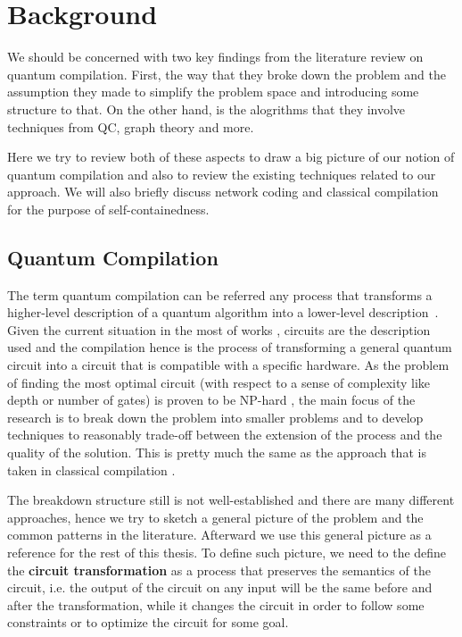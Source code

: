 \documentclass{report}
\begin{document}
\chapter{Background}\label{chap:background}

We should be concerned with two key findings from the literature review on quantum compilation. First, the way that they broke down the problem and the assumption they made to simplify the problem space and introducing some structure to that. On the other hand, is the alogrithms that they involve techniques from QC, graph theory and more.

Here we try to review both of these aspects to draw a big picture of our notion of quantum compilation and also to review the existing techniques related to our approach. We will also briefly discuss network coding and classical compilation for the purpose of self-containedness.

\section{Quantum Compilation}


The term quantum compilation can be referred any process that transforms a higher-level description of a quantum algorithm into a lower-level description~\cite{hundt2022}. Given the current situation in the most of works \cite{zulehner2018,childs,cross2022,sivarajah2021,qiskit2023,paler2021}, circuits are the description used and the compilation hence is the process of transforming a general quantum circuit into a circuit that is compatible with a specific hardware. As the problem of finding the most optimal circuit (with respect to a sense of complexity like depth or number of gates) is proven to be NP-hard \cite{siraichi2018}, the main focus of the research is to break down the problem into smaller problems and to develop techniques to reasonably trade-off between the extension of the process and the quality of the solution. This is pretty much the same as the approach that is taken in classical compilation \cite{allen2001}.

The breakdown structure still is not well-established and there are many different approaches, hence we try to sketch a general picture of the problem and the common patterns in the literature. Afterward we use this general picture as a reference for the rest of this thesis. To define such picture, we need to the define the \textbf{circuit transformation} as a process that preserves the semantics of the circuit, i.e. the output of the circuit on any input will be the same before and after the transformation, while it changes the circuit in order to follow some constraints or to optimize the circuit for some goal.
\end{document}
